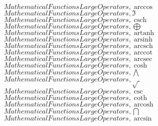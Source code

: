 \documentclass{article}
\begin{document}
$Mathematical Functions Large Operators,\arccos$
\linebreak
\linebreak
$Mathematical Functions Large Operators,\Im$
\linebreak
\linebreak
$Mathematical Functions Large Operators,\operatorname{csch}$
\linebreak
\linebreak
$Mathematical Functions Large Operators,\bigoplus$
\linebreak
\linebreak
$Mathematical Functions Large Operators,\operatorname{artanh}$
\linebreak
\linebreak
$Mathematical Functions Large Operators,\operatorname{arsinh}$
\linebreak
\linebreak
$Mathematical Functions Large Operators,\operatorname{arcsch}$
\linebreak
\linebreak
$Mathematical Functions Large Operators,\operatorname{arccot}$
\linebreak
\linebreak
$Mathematical Functions Large Operators,\operatorname{arcsec}$
\linebreak
\linebreak
$Mathematical Functions Large Operators,\cosh$
\linebreak
\linebreak
$Mathematical Functions Large Operators,\bigwedge$
\linebreak
\linebreak
$Mathematical Functions Large Operators,\sqrt{\;}$
\linebreak
\linebreak
$Mathematical Functions Large Operators,\csc$
\linebreak
\linebreak
$Mathematical Functions Large Operators,\coth$
\linebreak
\linebreak
$Mathematical Functions Large Operators,\operatorname{arcosh}$
\linebreak
\linebreak
$Mathematical Functions Large Operators,\bigcap$
\linebreak
\linebreak
$Mathematical Functions Large Operators,\arcsin$
\linebreak
\end{document}
